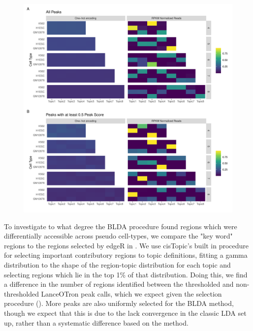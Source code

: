 \begin{figure}
  \centering
  \includegraphics[width = \textwidth]{plot/ch4/pb_thresholding_topics.pdf}
  \label{fig:pb_no_thresh_lot_topics}
\end{figure}

To investigate to what degree the BLDA procedure found regions which were differentially accessible across pseudo cell-types, we compare the "key word" regions to the regions selected by edgeR in . We use cisTopic's built in procedure for selecting important contributory regions to topic definitions, fitting a gamma distribution to the shape of the region-topic distribution for each topic and selecting regions which lie in the top 1\% of that distribution. Doing this, we find a difference in the number of regions identified between the thresholded and non-thresholded LanceOTron peak calls, which we expect given the selection procedure (). More peaks are also uniformly selected for the BLDA method, though we expect that this is due to the lack convergence in the classic LDA set up, rather than a systematic difference based on the method. 

